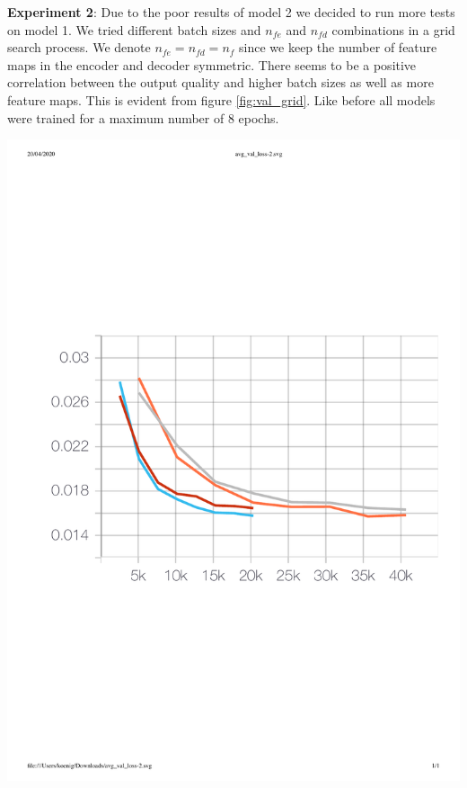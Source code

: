 \documentclass{article}
\newenvironment{Figure}
  {\par\medskip\noindent\minipage{\linewidth}}
  {\endminipage\par\medskip}
\begin{document}
\begin{multicols}{2}
\textbf{Experiment 2}: Due to the poor results of model 2 we decided to run more tests on model 1. We tried different batch sizes and $n_{fe}$ and $n_{fd}$ combinations in a grid search process. We denote $n_{fe} = n_{fd} = n_{f}$ since we keep the number of feature maps in the encoder and decoder symmetric. There seems to be a positive correlation between the output quality and higher batch sizes as well as more feature maps. This is evident from figure \ref{fig:val_grid}. Like before all models were trained for a maximum number of 8 epochs.

\begin{Figure}
	\centering 
	\includegraphics[width=\linewidth]{figures/grid_model_1}
	\label{fig:val_grid}
\end{Figure}


\end{multicols}
\end{document}
